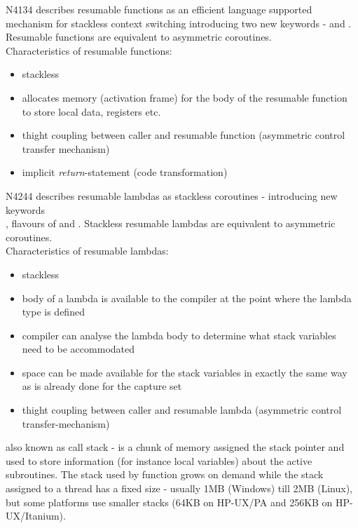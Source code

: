 N4134\cite{N4134} describes resumable functions as an efficient language
supported mechanism for stackless context switching introducing two new keywords
- \await and \yield. Resumable functions are equivalent to asymmetric
coroutines.\\
Characteristics of resumable functions:
\begin{itemize}
    \item stackless
    \item allocates memory (activation frame) for the body of the resumable
          function to store local data, registers etc.
    \item thight coupling between caller and resumable function (asymmetric
          control transfer mechanism)
    \item implicit \textit{return}-statement\cite{N4134} (code transformation)
\end{itemize}

N4244\cite{N4244} describes resumable lambdas as stackless coroutines -
introducing new keywords\\
\resumable, flavours of \yield and \rlthis. Stackless resumable lambdas are
equivalent to asymmetric coroutines.\\
Characteristics of resumable lambdas:
\begin{itemize}
    \item stackless
    \item body of a lambda is available to the compiler at the point
          where the lambda type is defined
    \item compiler can analyse the lambda body to determine what stack
          variables need to be accommodated
    \item space can be made available for the stack variables in exactly the
          same way as is already done for the capture set
    \item thight coupling between caller and resumable lambda (asymmetric
          control transfer-mechanism)
\end{itemize}

also known as call stack - is a chunk of memory assigned the stack pointer and
used to store information (for instance local variables) about the active
subroutines. The stack used by function \main grows on demand while the stack
assigned to a thread has a fixed size - usually 1MB (Windows) till 2MB (Linux),
but some platforms use smaller stacks (64KB on HP-UX/PA and 256KB on
HP-UX/Itanium).

